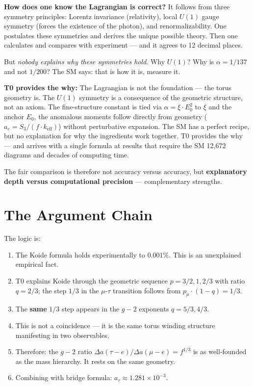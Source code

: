 \textbf{How does one know the Lagrangian is correct?} It follows from three symmetry principles: Lorentz invariance (relativity), local $U(1)$ gauge symmetry (forces the existence of the photon), and renormalizability. One postulates these symmetries and derives the unique possible theory. Then one calculates and compares with experiment --- and it agrees to 12 decimal places.

But \textit{nobody explains why these symmetries hold}. Why $U(1)$? Why is $\alpha = 1/137$ and not $1/200$? The SM says: that is how it is, measure it.

\textbf{T0 provides the why:} The Lagrangian is not the foundation --- the torus geometry is. The $U(1)$ symmetry is a consequence of the geometric structure, not an axiom. The fine-structure constant is tied via $\alpha = \xi \cdot E_0^2$ to $\xi$ and the anchor $E_0$, the anomalous moments follow directly from geometry ($a_e = S_3/(f \cdot k_\text{eff})$) without perturbative expansion. The SM has a perfect recipe, but no explanation for why the ingredients work together. T0 provides the why --- and arrives with a single formula at results that require the SM 12,672 diagrams and decades of computing time.

The fair comparison is therefore not accuracy versus accuracy, but \textbf{explanatory depth versus computational precision} --- complementary strengths.

\section{The Argument Chain}

The logic is:
\begin{enumerate}
	\item The Koide formula holds experimentally to $0.001\%$. This is an unexplained empirical fact.
	\item T0 explains Koide through the geometric sequence $p = 3/2, 1, 2/3$ with ratio $q = 2/3$; the step $1/3$ in the $\mu$-$\tau$ transition follows from $p_\mu \cdot (1-q) = 1/3$.
	\item The \textbf{same} $1/3$ step appears in the $g-2$ exponents $q = 5/3, 4/3$.
	\item This is not a coincidence --- it is the same torus winding structure manifesting in two observables.
	\item Therefore: the $g-2$ ratio $\Delta a(\tau{-}e)/\Delta a(\mu{-}e) = f^{1/3}$ is as well-founded as the mass hierarchy. It rests on the same geometry.
	\item Combining with bridge formula: $a_\tau \approx 1.281 \times 10^{-3}$.
\end{enumerate}

